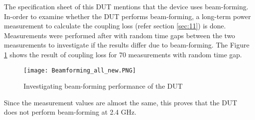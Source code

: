 The specification sheet of this \acs{DUT} mentions that the device uses beam-forming. In-order to examine whether the \acs{DUT} performs beam-forming, a long-term power measurement to calculate the coupling loss (refer section \ref{sec:11}) is done. Measurements were performed after with random time gaps between the two measurements to investigate if the results differ due to beam-forming. The Figure \ref{fig:11} shows the result of coupling loss for 70 measurements with random time gap. 

\begin{figure}[H]
\centering
\texttt{[image: Beamforming\_all\_new.PNG]}
\caption{Investigating beam-forming performance of the \acs{DUT}}
\label{fig:11} 
\end{figure}

Since the measurement values are almost the same, this proves that the \acs{DUT} does not perform beam-forming at 2.4 GHz.







